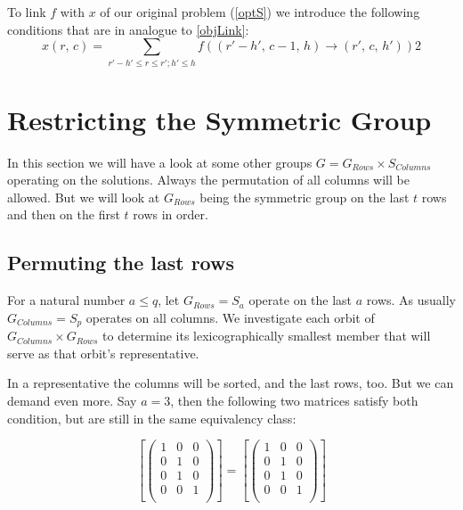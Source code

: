 \documentclass{amsart}
\theoremstyle{definition}
\newcommand{\lr}[1]{\ensuremath{\left( #1 \right)}}
\newcommand{\lrE}[1]{\ensuremath{\left[ #1 \right]}}
\begin{document}


To link \(f\) with \(x\) of our original problem (\ref{optS}) we
introduce the following conditions that are in analogue to \ref{objLink}:
\begin{equation}
  x \left( r,\, c \right) =
  \sum_{r' - h' \leq r \leq r'; h' \leq h} f\left(\left(r'-h',\, c-1,\, h\right)
    \rightarrow \left(r',\, c,\, h'\right) \right)
2\end{equation}

\section{Restricting the Symmetric Group}
In this section we will have a look at some other groups \(G =
G_{Rows} \times S_{Columns}\) operating on the solutions.  Always the
permutation of all columns will be allowed.  But we will look at
\(G_{Rows}\) being the symmetric group on the last \(t\) rows and then
on the first \(t\) rows in order.

\subsection{Permuting the last rows}

For a natural number \(a \leq q\), let \(G_{Rows} = S_a\) operate on
the last \(a\) rows.  As usually \(G_{Columns} = S_p\) operates on all
columns.  We investigate each orbit of \(G_{Columns} \times G_{Rows}\)
to determine its lexicographically smallest member that will serve as
that orbit's representative.

In a representative the columns will be sorted, and the last rows,
too.  But we can demand even more.  Say \(a = 3\), then the following
two matrices satisfy both condition, but are still in the same
equivalency class:

\[\lrE{\lr{\begin{matrix}
1 & 0 & 0 \\
0 & 1 & 0 \\
0 & 1 & 0 \\
0 & 0 & 1 \\
\end{matrix}}} = \lrE{\lr{\begin{matrix}
1 & 0 & 0 \\
0 & 1 & 0 \\
0 & 1 & 0 \\
0 & 0 & 1 \\
\end{matrix}}}
\]
\end{document}
